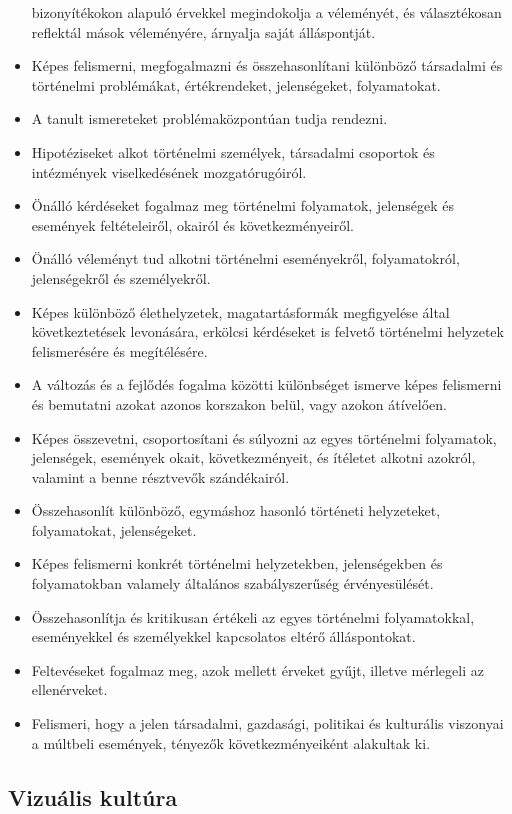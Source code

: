 \begin{itemize}
  bizonyítékokon alapuló érvekkel megindokolja a véleményét, és
  választékosan reflektál mások véleményére, árnyalja saját
  álláspontját.
\item
  Képes felismerni, megfogalmazni és összehasonlítani különböző
  társadalmi és történelmi problémákat, értékrendeket, jelenségeket,
  folyamatokat.
\item
  A tanult ismereteket problémaközpontúan tudja rendezni.
\item
  Hipotéziseket alkot történelmi személyek, társadalmi csoportok és
  intézmények viselkedésének mozgatórugóiról.
\item
  Önálló kérdéseket fogalmaz meg történelmi folyamatok, jelenségek és
  események feltételeiről, okairól és következményeiről.
\item
  Önálló véleményt tud alkotni történelmi eseményekről, folyamatokról,
  jelenségekről és személyekről.
\item
  Képes különböző élethelyzetek, magatartásformák megfigyelése által
  következtetések levonására, erkölcsi kérdéseket is felvető történelmi
  helyzetek felismerésére és megítélésére.
\item
  A változás és a fejlődés fogalma közötti különbséget ismerve képes
  felismerni és bemutatni azokat azonos korszakon belül, vagy azokon
  átívelően.
\item
  Képes összevetni, csoportosítani és súlyozni az egyes történelmi
  folyamatok, jelenségek, események okait, következményeit, és ítéletet
  alkotni azokról, valamint a benne résztvevők szándékairól.
\item
  Összehasonlít különböző, egymáshoz hasonló történeti helyzeteket,
  folyamatokat, jelenségeket.
\item
  Képes felismerni konkrét történelmi helyzetekben, jelenségekben és
  folyamatokban valamely általános szabályszerűség érvényesülését.
\item
  Összehasonlítja és kritikusan értékeli az egyes történelmi
  folyamatokkal, eseményekkel és személyekkel kapcsolatos eltérő
  álláspontokat.
\item
  Feltevéseket fogalmaz meg, azok mellett érveket gyűjt, illetve
  mérlegeli az ellenérveket.
\item
  Felismeri, hogy a jelen társadalmi, gazdasági, politikai és kulturális
  viszonyai a múltbeli események, tényezők következményeiként alakultak
  ki.
\end{itemize}

\hypertarget{vizualis-kultura}{%
\subsection{Vizuális kultúra}\label{vizualis-kultura}}

